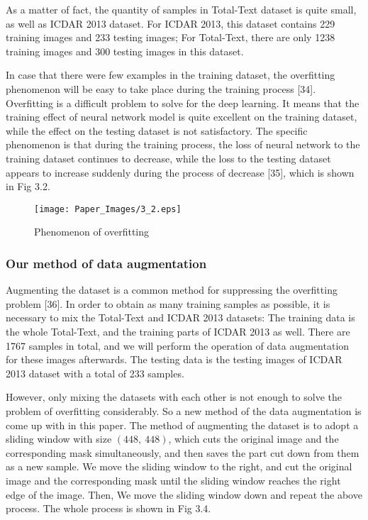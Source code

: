 \documentclass[22pt, UTF8]{article}
\numberwithin{figure}{section}
\numberwithin{table}{section}
\numberwithin{equation}{section} %
\begin{document}
\setlength\parindent{2em} As a matter of fact, the quantity of samples in Total-Text dataset is quite small, as well as ICDAR 2013 dataset. For ICDAR 2013, this dataset contains 229 training images and 233 testing images; For Total-Text, there are only 1238 training images and 300 testing images in this dataset.

\setlength\parindent{2em} In case that there were few examples in the training dataset, the overfitting phenomenon will be easy to take place during the training process [34]. Overfitting is a difficult problem to solve for the deep learning. It means that the training effect of neural network model is quite excellent on the training dataset, while the effect on the testing dataset is not satisfactory. The specific phenomenon is that during the training process, the loss of neural network to the training dataset continues to decrease, while the loss to the testing dataset appears to increase suddenly during the process of decrease [35], which is shown in Fig 3.2.

\begin{figure}[htbp]
    \centering
    \texttt{[image: Paper\_Images/3\_2.eps]}
    \vspace{-3mm} %
    \caption{Phenomenon of overfitting}
    \vspace{-4mm} %
\end{figure}

\subsubsection{Our method of data augmentation}

\setlength\parindent{2em} Augmenting the dataset is a common method for suppressing the overfitting problem [36]. In order to obtain as many training samples as possible, it is necessary to mix the Total-Text and ICDAR 2013 datasets: The training data is the whole Total-Text, and the training parts of ICDAR 2013 as well. There are 1767 samples in total, and we will perform the operation of data augmentation for these images afterwards. The testing data is the testing images of ICDAR 2013 dataset with a total of 233 samples.

\setlength\parindent{2em} However, only mixing the datasets with each other is not enough to solve the problem of overfitting considerably. So a new method of the data augmentation is come up with in this paper. The method of augmenting the dataset is to adopt a sliding window with size $(448,\ 448)$, which cuts the original image and the corresponding mask simultaneously, and then saves the part cut down from them as a new sample. We move the sliding window to the right, and cut the original image and the corresponding mask until the sliding window reaches the right edge of the image. Then, We move the sliding window down and repeat the above process. The whole process is shown in Fig 3.4.
\end{document}
